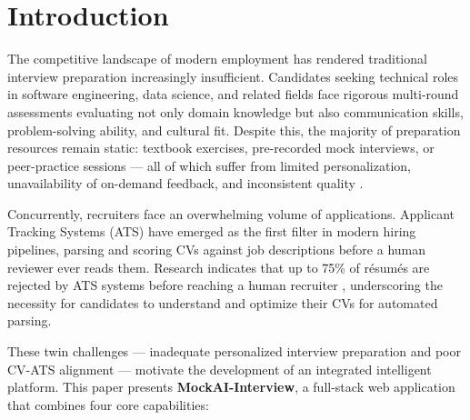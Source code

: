 \documentclass[pdflatex,sn-mathphys-num]{sn-jnl}%
\theoremstyle{thmstyleone}%
\theoremstyle{thmstyletwo}%
\theoremstyle{thmstylethree}%
\begin{document}

\maketitle

\section{Introduction}\label{sec1}

The competitive landscape of modern employment has rendered traditional interview preparation increasingly insufficient. Candidates seeking technical roles in software engineering, data science, and related fields face rigorous multi-round assessments evaluating not only domain knowledge but also communication skills, problem-solving ability, and cultural fit. Despite this, the majority of preparation resources remain static: textbook exercises, pre-recorded mock interviews, or peer-practice sessions — all of which suffer from limited personalization, unavailability of on-demand feedback, and inconsistent quality \cite{garcia2023ai}.

Concurrently, recruiters face an overwhelming volume of applications. Applicant Tracking Systems (ATS) have emerged as the first filter in modern hiring pipelines, parsing and scoring CVs against job descriptions before a human reviewer ever reads them. Research indicates that up to 75\% of résumés are rejected by ATS systems before reaching a human recruiter \cite{jobscan2023}, underscoring the necessity for candidates to understand and optimize their CVs for automated parsing.

These twin challenges — inadequate personalized interview preparation and poor CV-ATS alignment — motivate the development of an integrated intelligent platform. This paper presents \textbf{MockAI-Interview}, a full-stack web application that combines four core capabilities:
\end{document}
